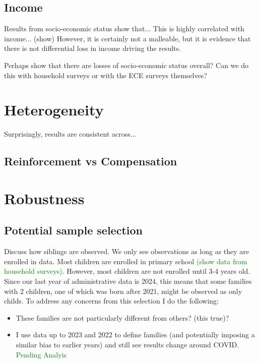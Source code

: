 \subsection{Income}

Results from socio-economic status show that... 
This is highly correlated with income... (show)
However, it is certainly not a malleable, but it is evidence that there is not differential loss in income driving the results.

Perhaps show that there are losses of socio-economic status overall? Can we do this with household surveys or with the ECE surveys themselves?

\section{Heterogeneity}\label{sec:heterogeneity}

Surprisingly, results are consistent across...

\subsection{Reinforcement vs Compensation}

\section{Robustness}\label{sec:robustness}

\subsection{Potential sample selection}

Discuss how siblings are observed. We only see observations as long as they are enrolled in data. Most children are enrolled in primary school \textcolor{green}{(show data from household surveys)}. However, most children are not enrolled until 3-4 years old. Since our last year of administrative data is 2024, this means that some families with 2 children, one of which was born after 2021, might be observed as only childs. To address any concerns from this selection I do the following:

\begin{itemize}
    \item These families are not particularly different from others? (this true)?
    \item I use data up to 2023 and 2022 to define families (and potentially imposing a similar bias to earlier years) and still see results change around COVID. \textcolor{green}{Pending Analyis}
\end{itemize}


